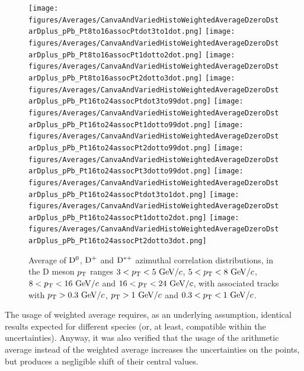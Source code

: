 \begin{figure}
\centering
{\texttt{[image: figures/Averages/CanvaAndVariedHistoWeightedAverageDzeroDstarDplus\_pPb\_Pt8to16assocPtdot3to1dot.png]}}
{\texttt{[image: figures/Averages/CanvaAndVariedHistoWeightedAverageDzeroDstarDplus\_pPb\_Pt8to16assocPt1dotto2dot.png]}}
{\texttt{[image: figures/Averages/CanvaAndVariedHistoWeightedAverageDzeroDstarDplus\_pPb\_Pt8to16assocPt2dotto3dot.png]}}
{\texttt{[image: figures/Averages/CanvaAndVariedHistoWeightedAverageDzeroDstarDplus\_pPb\_Pt16to24assocPtdot3to99dot.png]}}
{\texttt{[image: figures/Averages/CanvaAndVariedHistoWeightedAverageDzeroDstarDplus\_pPb\_Pt16to24assocPt1dotto99dot.png]}}
{\texttt{[image: figures/Averages/CanvaAndVariedHistoWeightedAverageDzeroDstarDplus\_pPb\_Pt16to24assocPt2dotto99dot.png]}}
{\texttt{[image: figures/Averages/CanvaAndVariedHistoWeightedAverageDzeroDstarDplus\_pPb\_Pt16to24assocPt3dotto99dot.png]}}
{\texttt{[image: figures/Averages/CanvaAndVariedHistoWeightedAverageDzeroDstarDplus\_pPb\_Pt16to24assocPtdot3to1dot.png]}}
{\texttt{[image: figures/Averages/CanvaAndVariedHistoWeightedAverageDzeroDstarDplus\_pPb\_Pt16to24assocPt1dotto2dot.png]}}
{\texttt{[image: figures/Averages/CanvaAndVariedHistoWeightedAverageDzeroDstarDplus\_pPb\_Pt16to24assocPt2dotto3dot.png]}}
 \caption{Average of ${\rm D^0}$, ${\rm D^+}$ and ${\rm D^{*+}}$ azimuthal correlation distributions, in the D meson $p_{\rm T}$ ranges $3<p_{\rm T}<5~\mathrm{GeV}/c$, $5<p_{\rm T}<8~\mathrm{GeV}/c$, $8<p_{\rm T}<16~\mathrm{GeV}/c$ and $16<p_{\rm T}<24~\mathrm{GeV}/c$, with associated tracks with $p_{\rm T}>0.3~\mathrm{GeV}/c$, $p_{\rm T}>1~\mathrm{GeV}/c$ and $0.3 < p_{\rm T} < 1~\mathrm{GeV}/c$.}
 \label{fig:DmesonAverage}
\end{figure}

The usage of weighted average requires, as an underlying assumption, identical results expected for different species (or, at least, compatible within the uncertainties). Anyway, it was also verified that the usage of the arithmetic average instead of the weighted average increases the uncertainties on the points, but produces a negligible shift of their central values.


